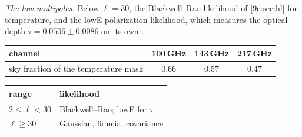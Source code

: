 \emph{The low multipoles.} Below $\ell=30$, the Blackwell--Rao likelihood of \cref{9c:sec:hl} for temperature, and the
lowE polarization likelihood, which measures the optical depth $\tau=0.0506\pm0.0086$ on its own \cite{Planck2018VI}.
\begin{center}
\small
\renewcommand{\arraystretch}{1.15}
\begin{tabular}{@{}lccc@{}}
\toprule
channel & 100\,GHz & 143\,GHz & 217\,GHz\\\midrule
sky fraction of the temperature mask & $0.66$ & $0.57$ & $0.47$\\
\bottomrule
\end{tabular}
\qquad
\begin{tabular}{@{}ll@{}}
\toprule
range & likelihood\\\midrule
$2\le\ell<30$ & Blackwell--Rao; lowE for $\tau$\\
$\ell\ge30$ & Gaussian, fiducial covariance\\
\bottomrule
\end{tabular}
\end{center}

